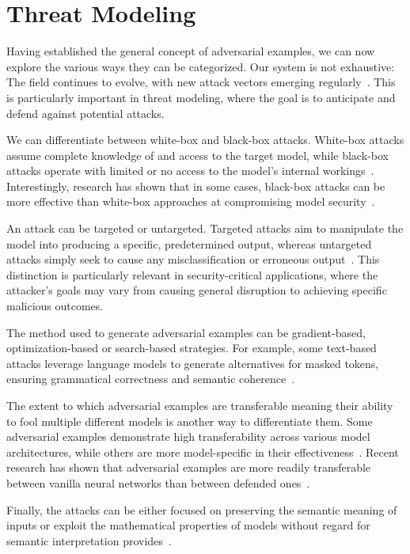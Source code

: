 \documentclass[a4paper, oneside]{discothesis}
\begin{document}
\section{Threat Modeling}

Having established the general concept of adversarial examples, we can now explore the various ways they can be categorized. Our system is not exhaustive: The field continues to evolve, with new attack vectors emerging regularly~\cite{Khaleel2024AdversarialAI}. This is particularly important in threat modeling, where the goal is to anticipate and defend against potential attacks.

We can differentiate between white-box and black-box attacks. White-box attacks assume complete knowledge of and access to the target model, while black-box attacks operate with limited or no access to the model's internal workings~\cite{capozzi2024adversarial}. Interestingly, research has shown that in some cases, black-box attacks can be more effective than white-box approaches at compromising model security~\cite{capozzi2024adversarial}.

An attack can be targeted or untargeted. Targeted attacks aim to manipulate the model into producing a specific, predetermined output, whereas untargeted attacks simply seek to cause any misclassification or erroneous output~\cite{capozzi2024adversarial, Kashyap2024AdversarialAA}. This distinction is particularly relevant in security-critical applications, where the attacker's goals may vary from causing general disruption to achieving specific malicious outcomes.

The method used to generate adversarial examples can be gradient-based, optimization-based or search-based strategies. For example, some text-based attacks leverage language models to generate alternatives for masked tokens, ensuring grammatical correctness and semantic coherence~\cite{garg2020bae}.

The extent to which adversarial examples are transferable \textendash{} meaning their ability to fool multiple different models \textendash{} is another way to differentiate them. Some adversarial examples demonstrate high transferability across various model architectures, while others are more model-specific in their effectiveness~\cite{Li2022ASO, li2022review}. Recent research has shown that adversarial examples are more readily transferable between vanilla neural networks than between defended ones~\cite{li2019nattack, zheng2023black}.

Finally, the attacks can be either focused on preserving the semantic meaning of inputs or exploit the mathematical properties of models without regard for semantic interpretation provides~\cite{browne2020semantics}.
\end{document}
